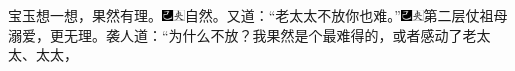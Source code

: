 宝玉想一想，果然有理。{\includegraphics[width=3mm]{../Images/00003}\includegraphics[width=3mm]{../Images/00012}\footnotesize \kaishu 自然。}又道：``老太太不放你也难。''{\includegraphics[width=3mm]{../Images/00003}\includegraphics[width=3mm]{../Images/00012}\footnotesize \kaishu 第二层仗祖母溺爱，更无理。}袭人道：``为什么不放？我果然是个最难得的，或者感动了老太太、太太，